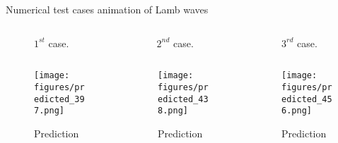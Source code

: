 \documentclass[10pt,aspectratio=169,dvipsnames]{beamer} %
\begin{document}
\begin{frame}{Numerical test cases animation of Lamb waves}
	\begin{columns}[T]
		\begin{column}[c]{0.32\textwidth}
			\begin{figure}
				\caption{\(1^{st}\) case.}
			\end{figure}
		\end{column}
		\begin{column}[c]{0.32\textwidth}
			\begin{figure}
				\caption{\(2^{nd}\) case.}
			\end{figure}
		\end{column}
		\begin{column}[c]{0.32\textwidth}
			\begin{figure}
				\caption{\(3^{rd}\) case.}
			\end{figure}
		\end{column}
	\end{columns}
	\begin{columns}[T]
		\begin{column}[c]{0.32\textwidth}
			\begin{figure}
				\texttt{[image: figures/predicted\_397.png]}
				\caption{Prediction}
			\end{figure}
		\end{column}
		\begin{column}[c]{0.32\textwidth}
			\begin{figure}
				\texttt{[image: figures/predicted\_438.png]}
				\caption{Prediction}
			\end{figure}
		\end{column}
		\begin{column}[c]{0.32\textwidth}
			\begin{figure}
				\texttt{[image: figures/predicted\_456.png]}
				\caption{Prediction}
			\end{figure}
		\end{column}
	\end{columns}
\end{frame}
\end{document}
